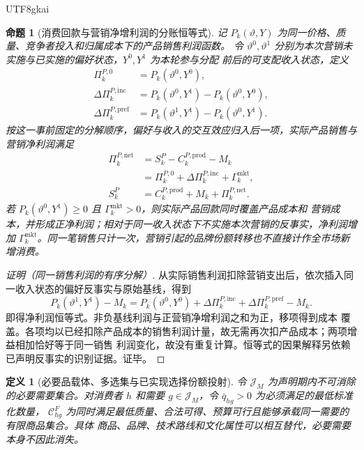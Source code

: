 \documentclass[12pt,a4paper,openany]{report}
\newtheorem{definition}{定义}[chapter]
\newtheorem{proposition}{命题}[chapter]
\begin{document}
\begin{CJK*}{UTF8}{gkai}
\begin{proposition}[消费回款与营销净增利润的分账恒等式]
\label{prop:sales-marketing-accounting}
记 \(P_k(\vartheta,Y)\) 为同一价格、质量、竞争者投入和归属成本下的产品销售利润函数。
令 \(\vartheta^0,\vartheta^1\) 分别为本次营销未实施与已实施的偏好状态，\(Y^0,Y^1\) 为本轮参与分配
前后的可支配收入状态，定义
\[
\begin{aligned}
  \Pi_k^{P,0}&=P_k(\vartheta^0,Y^0),\\
  \Delta\Pi_k^{P,\mathrm{inc}}
    &=P_k(\vartheta^0,Y^1)-P_k(\vartheta^0,Y^0),\\
  \Delta\Pi_k^{P,\mathrm{pref}}
    &=P_k(\vartheta^1,Y^1)-P_k(\vartheta^0,Y^1).
\end{aligned}
\]
按这一事前固定的分解顺序，偏好与收入的交互效应归入后一项，实际产品销售与营销净利润满足
\[
\begin{aligned}
  \Pi_k^{P,\mathrm{net}}
  &=S_k^P-C_k^{P,\mathrm{prod}}-M_k\\
  &=\Pi_k^{P,0}+\Delta\Pi_k^{P,\mathrm{inc}}
    +\Gamma_k^{\mathrm{mkt}},\\
  S_k^P&=C_k^{P,\mathrm{prod}}+M_k+\Pi_k^{P,\mathrm{net}}.
\end{aligned}
\]
若 \(P_k(\vartheta^0,Y^1)\ge0\) 且 \(\Gamma_k^{\mathrm{mkt}}>0\)，则实际产品回款同时覆盖产品成本和
营销成本，并形成正净利润；相对于同一收入状态下不实施本次营销的反事实，净利润增加
\(\Gamma_k^{\mathrm{mkt}}\)。同一笔销售只计一次，营销引起的品牌份额转移也不直接计作全市场新增消费。
\end{proposition}

\begin{proof}[证明（同一销售利润的有序分解）]
从实际销售利润扣除营销支出后，依次插入同一收入状态的偏好反事实与原始基线，得到
\[
  P_k(\vartheta^1,Y^1)-M_k
  =P_k(\vartheta^0,Y^0)+\Delta\Pi_k^{P,\mathrm{inc}}
    +\Delta\Pi_k^{P,\mathrm{pref}}-M_k.
\]
即得净利润恒等式。非负基线利润与正营销净增利润之和为正，移项得到成本
覆盖。各项均以已经扣除产品成本的销售利润计量，故无需再次扣产品成本；两项增益相加恰好等于同一销售
利润变化，故没有重复计算。恒等式的因果解释另依赖已声明反事实的识别证据。证毕。
\end{proof}

\begin{definition}[必要品载体、多选集与已实现选择份额投射]
令 \(\mathcal J_M\) 为声明期内不可消除的必要需要集合。对消费者 \(h\) 和需要
\(g\in\mathcal J_M\)，令 \(\bar q_{hg}>0\) 为必须满足的最低标准化数量，
\(\mathcal C_{hg}^{F}\) 为同时满足最低质量、合法可得、预算可行且能够承载同一需要的有限商品集合。具体
商品、品牌、技术路线和文化属性可以相互替代，必要需要本身不因此消失。


\end{definition}
\end{CJK*}
\end{document}
